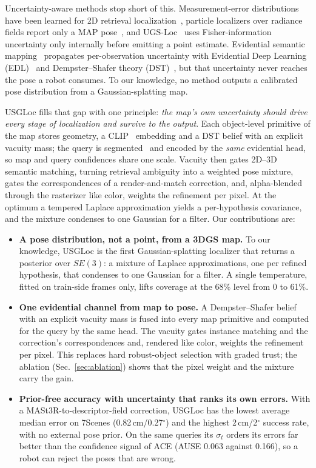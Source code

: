 \documentclass[journal]{IEEEtran}
\newcommand{\method}{USGLoc}
\begin{document}
Uncertainty-aware methods stop short of this. Measurement-error distributions have been learned for 2D retrieval localization~\cite{ksenet}, particle localizers over radiance fields report only a MAP pose~\cite{locnerf}, and UGS-Loc~\cite{ugsloc} uses Fisher-information uncertainty only internally before emitting a point estimate. Evidential semantic mapping~\cite{ebs,e2bki} propagates per-observation uncertainty with Evidential Deep Learning (EDL)~\cite{edl} and Dempster--Shafer theory (DST)~\cite{dst}, but that uncertainty never reaches the pose a robot consumes. To our knowledge, no method outputs a calibrated pose distribution from a Gaussian-splatting map.

\method{} fills that gap with one principle: \emph{the map's own uncertainty should drive every stage of localization and survive to the output}. Each object-level primitive of the map stores geometry, a CLIP~\cite{clip} embedding and a DST belief with an explicit vacuity mass; the query is segmented~\cite{fastsam} and encoded by the \emph{same} evidential head, so map and query confidences share one scale. Vacuity then gates 2D--3D semantic matching, turning retrieval ambiguity into a weighted pose mixture, gates the correspondences of a render-and-match correction, and, alpha-blended through the rasterizer like color, weights the refinement per pixel. At the optimum a tempered Laplace approximation yields a per-hypothesis covariance, and the mixture condenses to one Gaussian for a filter. Our contributions are:

\begin{itemize}
\item \textbf{A pose distribution, not a point, from a 3DGS map.} To our knowledge, \method{} is the first Gaussian-splatting localizer that returns a posterior over $SE(3)$: a mixture of Laplace approximations, one per refined hypothesis, that condenses to one Gaussian for a filter. A single temperature, fitted on train-side frames only, lifts coverage at the 68\% level from 0 to 61\%.
\item \textbf{One evidential channel from map to pose.} A Dempster--Shafer belief with an explicit vacuity mass is fused into every map primitive and computed for the query by the same head. The vacuity gates instance matching and the correction's correspondences and, rendered like color, weights the refinement per pixel. This replaces hard robust-object selection with graded trust; the ablation (Sec.~\ref{sec:ablation}) shows that the pixel weight and the mixture carry the gain.
\item \textbf{Prior-free accuracy with uncertainty that ranks its own errors.} With a MASt3R-to-descriptor-field correction, \method{} has the lowest average median error on 7Scenes (0.82\,cm/0.27$^\circ$) and the highest 2\,cm/2$^\circ$ success rate, with no external pose prior. On the same queries its $\sigma_t$ orders its errors far better than the confidence signal of ACE (AUSE 0.063 against 0.166), so a robot can reject the poses that are wrong.
\end{itemize}
\end{document}
